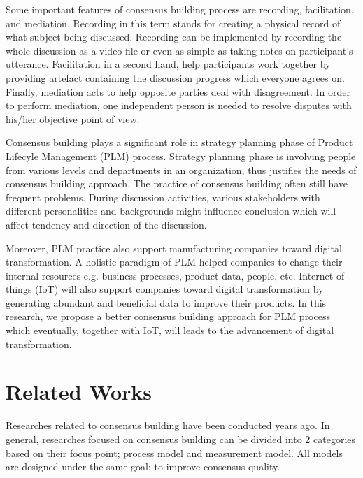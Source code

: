 \documentclass[10pt, conference, compsocconf]{IEEEtran}
\begin{document}
Some important features of consensus building process are recording, facilitation, and mediation\cite{b1}. Recording in this term stands for creating a physical record of what subject being discussed. Recording can be implemented by recording the whole discussion as a video file or even as simple as taking notes on participant's utterance. Facilitation in a second hand, help participants work together by providing artefact containing the discussion progress which everyone agrees on. Finally, mediation acts to help opposite parties deal with disagreement. In order to perform mediation, one independent person is needed to resolve disputes with his/her objective point of view.

Consensus building plays a significant role in strategy planning phase of Product Lifecyle Management (PLM) process\cite{b23}.  Strategy planning phase is involving people from various levels and departments in an organization\cite{b1}, thus justifies the needs of consensus building approach. The practice of consensus building often still have frequent problems. During discussion activities, various stakeholders with different personalities and backgrounds might influence conclusion\cite{b2} which will affect tendency and direction of the discussion\cite{b3}.

Moreover, PLM practice also support manufacturing companies toward digital transformation\cite{b24}. A holistic paradigm of PLM helped companies to change their internal resources e.g. business processes, product data, people, etc. Internet of things (IoT) will also support companies toward digital transformation by generating abundant and beneficial data to improve their products. In this research, we propose a better consensus building approach for PLM process which eventually, together with IoT, will leads to the advancement of digital transformation.

\section{Related Works}
\label{sec_rp}
Researches related to consensus building have been conducted years ago. In general, researches focused on consensus building can be divided into 2 categories based on their focus point; process model and measurement model. All models are designed under the same goal: to improve consensus quality.
\end{document}
